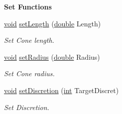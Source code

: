 \begin{Indent}{\bf Set Functions}\par
\begin{DoxyCompactItemize}
\item 
\hyperlink{group___u_a_v_objects_plugin_ga444cf2ff3f0ecbe028adce838d373f5c}{void} \hyperlink{class_g_l_c___cone_aac947d38f94f73522bef74d0bba0dac0}{set\-Length} (\hyperlink{_super_l_u_support_8h_a8956b2b9f49bf918deed98379d159ca7}{double} Length)
\begin{DoxyCompactList}\small\item\em Set Cone length. \end{DoxyCompactList}\item 
\hyperlink{group___u_a_v_objects_plugin_ga444cf2ff3f0ecbe028adce838d373f5c}{void} \hyperlink{class_g_l_c___cone_ae988c8c106a05f92ae9bd27ed4b0a6b3}{set\-Radius} (\hyperlink{_super_l_u_support_8h_a8956b2b9f49bf918deed98379d159ca7}{double} Radius)
\begin{DoxyCompactList}\small\item\em Set Cone radius. \end{DoxyCompactList}\item 
\hyperlink{group___u_a_v_objects_plugin_ga444cf2ff3f0ecbe028adce838d373f5c}{void} \hyperlink{class_g_l_c___cone_a9e1b5ff49c2ddf6e688e375f561e8628}{set\-Discretion} (\hyperlink{ioapi_8h_a787fa3cf048117ba7123753c1e74fcd6}{int} Target\-Discret)
\begin{DoxyCompactList}\small\item\em Set Discretion. \end{DoxyCompactList}\end{DoxyCompactItemize}
\end{Indent}
